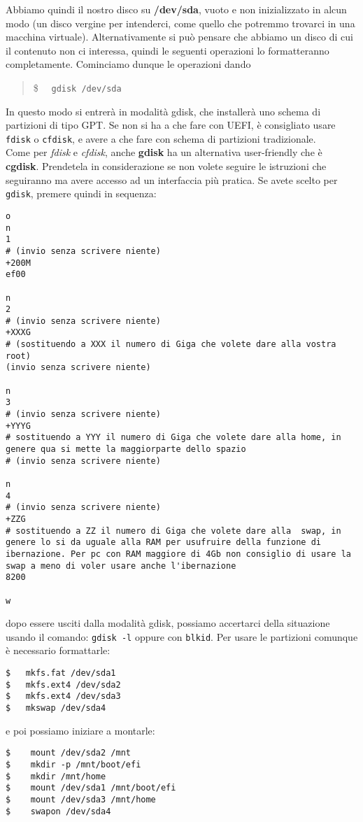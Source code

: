 \documentclass[twoside,italian]{book}
\newcommand{\code}[1]{\texttt{#1}}
\newcommand{\shellcode}[1]{\$$\quad$ \texttt{#1}}
\newcommand{\centcode}[1]{
	\begin{quote}
		\color{code}
		\shellcode{#1}
	\end{quote}
}
\begin{document}
    Abbiamo quindi il nostro disco su \textbf{/dev/sda}, vuoto e non inizializzato in alcun modo (un disco vergine per intenderci, come quello che potremmo trovarci in una macchina virtuale). Alternativamente si può pensare che abbiamo un disco  di cui il contenuto non ci interessa, quindi le seguenti operazioni lo formatteranno completamente. Cominciamo dunque le operazioni dando \centcode{gdisk /dev/sda}
    In questo modo si entrerà in modalità gdisk, che installerà uno schema di partizioni di tipo GPT. Se non si ha a che fare con UEFI, è consigliato usare \code{fdisk} o \code{cfdisk}, e avere a che fare con schema di partizioni tradizionale.\\
    Come per \textit{fdisk} e \textit{cfdisk}, anche \textbf{gdisk} ha un alternativa user-friendly che è \textbf{cgdisk}. Prendetela in considerazione se non volete seguire le istruzioni che seguiranno ma avere accesso ad un interfaccia più pratica.
    Se avete scelto per \code{gdisk}, premere quindi in sequenza:\\
\begin{lstlisting}
o
n
1
# (invio senza scrivere niente)
+200M
ef00

n
2
# (invio senza scrivere niente)
+XXXG
# (sostituendo a XXX il numero di Giga che volete dare alla vostra root)
(invio senza scrivere niente)

n
3
# (invio senza scrivere niente)
+YYYG
# sostituendo a YYY il numero di Giga che volete dare alla home, in genere qua si mette la maggiorparte dello spazio
# (invio senza scrivere niente)

n
4
# (invio senza scrivere niente)
+ZZG
# sostituendo a ZZ il numero di Giga che volete dare alla  swap, in genere lo si da uguale alla RAM per usufruire della funzione di ibernazione. Per pc con RAM maggiore di 4Gb non consiglio di usare la swap a meno di voler usare anche l'ibernazione
8200

w
\end{lstlisting}

    dopo essere usciti dalla modalità gdisk, possiamo accertarci della situazione usando il comando: \code{gdisk -l} oppure con \code{blkid}.
    Per usare le partizioni comunque è necessario formattarle:
\begin{lstlisting}
$   mkfs.fat /dev/sda1
$   mkfs.ext4 /dev/sda2
$   mkfs.ext4 /dev/sda3
$   mkswap /dev/sda4
\end{lstlisting}

    e poi possiamo iniziare a montarle:
\begin{lstlisting}
$    mount /dev/sda2 /mnt
$    mkdir -p /mnt/boot/efi
$    mkdir /mnt/home
$    mount /dev/sda1 /mnt/boot/efi
$    mount /dev/sda3 /mnt/home
$    swapon /dev/sda4
\end{lstlisting}
\end{document}
